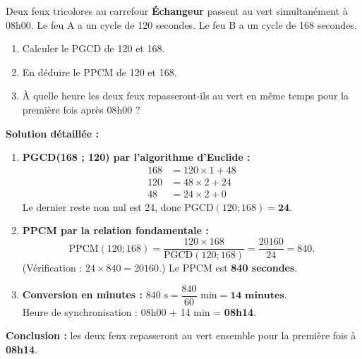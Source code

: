 \documentclass[11pt]{article}
\begin{document}
\begin{exoresolu}
Deux feux tricolores au carrefour \textbf{Échangeur} passent au vert simultanément à 08h00.
Le feu A a un cycle de \num{120} secondes. Le feu B a un cycle de \num{168} secondes.
\begin{enumerate}
    \item Calculer le PGCD de 120 et 168.
    \item En déduire le PPCM de 120 et 168.
    \item À quelle heure les deux feux repasseront-ils au vert en même temps pour la première fois après 08h00 ?
\end{enumerate}
\tcblower
\textbf{Solution détaillée :}
\begin{enumerate}
    \item \textbf{PGCD(168 ; 120) par l'algorithme d'Euclide :}
    \begin{align*}
    168 &= 120 \times 1 + 48 \\
    120 &= 48 \times 2 + 24 \\
    48 &= 24 \times 2 + 0
    \end{align*}
    Le dernier reste non nul est 24, donc $\text{PGCD}(120; 168) = \mathbf{24}$.
    \item \textbf{PPCM par la relation fondamentale :}
    \[ \text{PPCM}(120; 168) = \frac{120 \times 168}{\text{PGCD}(120; 168)} = \frac{20160}{24} = 840. \]
    (Vérification : $24 \times 840 = 20160$.) Le PPCM est \textbf{840 secondes}.
    \item \textbf{Conversion en minutes :} $840 \text{ s} = \dfrac{840}{60} \text{ min} = \mathbf{14 \text{ minutes}}$.\\
    Heure de synchronisation : 08h00 + 14 min = \textbf{08h14}.
\end{enumerate}
\textbf{Conclusion :} les deux feux repasseront au vert ensemble pour la première fois à \textbf{08h14}.
\end{exoresolu}
\end{document}
